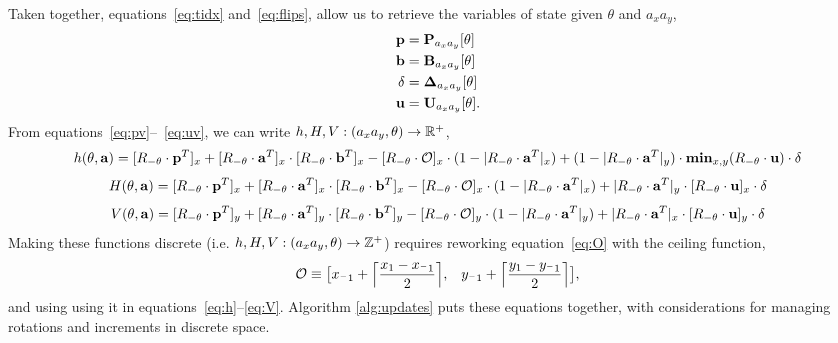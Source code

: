 Taken together, equations~\ref{eq:tidx} and~\ref{eq:flips}, allow us to retrieve the variables
 of state given $\theta$ and $a_xa_y$,
\begin{eqnarray}
    \mathbf{p} &= \mathbf{P}_{a_xa_y}[\theta] \label{eq:pv} \\
    \mathbf{b} &= \mathbf{B}_{a_xa_y}[\theta]\\
    \delta &= \mathbf{\Delta}_{a_xa_y}[\theta]\\
    \mathbf{u} &= \mathbf{U}_{a_xa_y}[\theta]. \label{eq:uv}
\end{eqnarray}
From equations~\ref{eq:pv}--~\ref{eq:uv}, we can write $h,H,V: (a_xa_y,\theta) \rightarrow \mathbb{R}^+$,
\begin{equation}
    h(\theta,\av) = [\rnt \cdot \pv^T]_x + [\rnt \cdot \av^T]_x \cdot [\rnt \cdot \bv^T]_x -
    [\rnt \cdot \orig]_x \cdot (1 - |\rnt \cdot \av^T|_x) +
    (1 - |\rnt \cdot \av^T|_y) \cdot \mathbf{min}_{x,y}(\rnt \cdot \uv ) \cdot \delta
    \label{eq:h}
\end{equation}
\begin{equation}
    H(\theta,\av) = [\rnt \cdot \pv^T]_x + [\rnt \cdot \av^T]_x \cdot [\rnt \cdot \bv^T]_x -
    [\rnt \cdot \orig]_x \cdot (1 - |\rnt \cdot \av^T|_x) +
    |\rnt \cdot \av^T|_y \cdot [\rnt \cdot \uv ]_x \cdot \delta
    \label{eq:H}
\end{equation}
\begin{equation}
    V(\theta,\av) = [\rnt \cdot \pv^T]_y + [\rnt \cdot \av^T]_y \cdot [\rnt \cdot \bv^T]_y -
    [\rnt \cdot \orig]_y \cdot (1 - |\rnt \cdot \av^T|_y) +
    |\rnt \cdot \av^T|_x \cdot [\rnt \cdot \uv ]_y \cdot \delta
    \label{eq:V}
\end{equation}
Making these functions discrete (i.e. $h,H,V: (a_xa_y,\theta) \rightarrow \mathbb{Z}^+$)
requires reworking equation~\ref{eq:O} with the ceiling function,
\begin{equation}
    \mathcal{O} \equiv \bigl[x_{^-1} + \ceil[\Big]{\frac{x_1 - x_{^-1}}{2}}, \;\;\;
                             y_{^-1} + \ceil[\Big]{\frac{y_1 - y_{^-1}}{2}} \bigl],
    \label{eq:discreteO}
\end{equation}
and using using it in equations~\eqref{eq:h}--\eqref{eq:V}.  Algorithm \ref{alg:updates}
puts these equations together, with considerations for managing rotations and
increments in discrete space.

